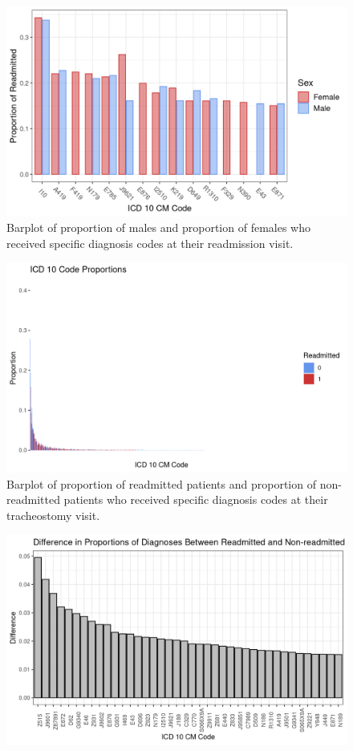\documentclass[sn-basic,pdflatex]{sn-jnl}
\theoremstyle{remark}
\theoremstyle{definition}
\begin{document}
\begin{appendices}
\begin{figure}[H]
{\centering \includegraphics[width=0.9\linewidth]{figures/readmit_diags} 

}

\caption{Barplot of proportion of males and proportion of females who received specific diagnosis codes at their readmission visit.}\label{fig:readmit_diags}
\end{figure}
\begin{figure}[H]

{\centering \includegraphics[width=1\linewidth]{figures/props} 

}

\caption{Barplot of proportion of readmitted patients and proportion of non-readmitted patients who received specific diagnosis codes at their tracheostomy visit.}\label{fig:props}
\end{figure}
\begin{figure}[H]

{\centering \includegraphics[width=1\linewidth]{figures/diffs} 

}
\end{figure}
\end{appendices}
\end{document}
